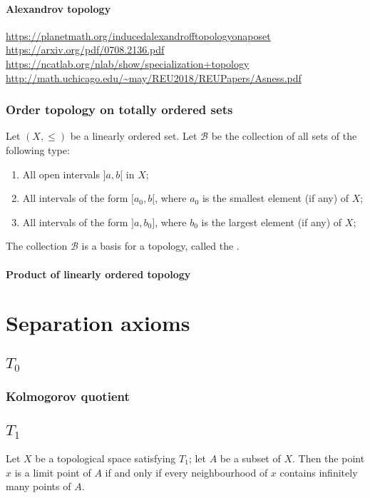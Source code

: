 \paragraph{Alexandrov topology}
\url{https://planetmath.org/inducedalexandrofftopologyonaposet}
\url{https://arxiv.org/pdf/0708.2136.pdf}
\url{https://ncatlab.org/nlab/show/specialization+topology}
\url{http://math.uchicago.edu/~may/REU2018/REUPapers/Asness.pdf}

\subsubsection{Order topology on totally ordered sets}
\begin{definition}
Let $(X,\leq)$ be a linearly ordered set. Let $\mathcal{B}$ be the collection of all sets of the following type:
\begin{enumerate}
\item All open intervals $]a,b[$ in $X$;
\item All intervals of the form $[a_0, b[$, where $a_0$ is the smallest element (if any) of $X$;
\item All intervals of the form $]a, b_0]$, where $b_0$ is the largest element (if any) of $X$;
\end{enumerate}
The collection $\mathcal{B}$ is a basis for a topology, called the .
\end{definition}

\paragraph{Product of linearly ordered topology}


\section{Separation axioms}
\subsection{$T_0$}
\subsubsection{Kolmogorov quotient}

\subsection{$T_1$}
\begin{proposition}
Let $X$ be a topological space satisfying $T_1$; let $A$ be a subset of $X$.
Then the point $x$ is a limit point of $A$ \textup{if and only if} every neighbourhood of $x$ contains infinitely many points of $A$.
\end{proposition}
